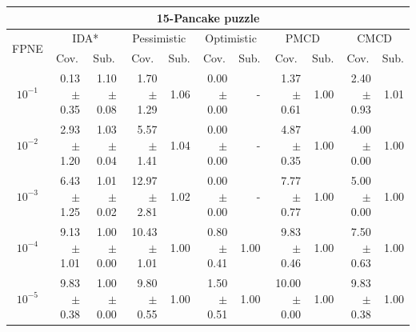 \documentclass[letterpaper]{article}
\begin{document}
\begin{table}[t]
\centering
\setlength{\tabcolsep}{4 pt}
\begin{tabular}{| c | r  r | r  r | r  r | r  r | r  r |}
\hline
\multicolumn{11}{|c|}{\textbf{15-Pancake puzzle}} \\
\hline
\multirow{2}{*}{FPNE}	& \multicolumn{2}{|c|}{IDA*} 	& \multicolumn{2}{|c|}{Pessimistic} 	& \multicolumn{2}{|c|}{Optimistic} 	& \multicolumn{2}{|c|}{PMCD} 	& \multicolumn{2}{|c|}{CMCD} 	\\
\cline{2-11} 
	& \multicolumn{1}{c}{Cov.} & \multicolumn{1}{c|}{Sub.} 	& \multicolumn{1}{c}{Cov.} & \multicolumn{1}{c|}{Sub.} 	& \multicolumn{1}{c}{Cov.} & \multicolumn{1}{c|}{Sub.} 	& \multicolumn{1}{c}{Cov.} & \multicolumn{1}{c|}{Sub.} 	& \multicolumn{1}{c}{Cov.} & \multicolumn{1}{c|}{Sub.} 	\\
\hline


$10^{-1}$	& 0.13 $\pm$ 0.35	& 1.10 $\pm$ 0.08	& 1.70 $\pm$ 1.29	& 1.06	& 0.00 $\pm$ 0.00	& - 	& 1.37 $\pm$ 0.61	& 1.00	& 2.40 $\pm$ 0.93	& 1.01	\\

$10^{-2}$	& 2.93 $\pm$ 1.20	& 1.03 $\pm$ 0.04	& 5.57 $\pm$ 1.41	& 1.04	& 0.00 $\pm$ 0.00	& - 	& 4.87 $\pm$ 0.35	& 1.00	& 4.00 $\pm$ 0.00	& 1.00	\\

$10^{-3}$	& 6.43 $\pm$ 1.25	& 1.01 $\pm$ 0.02	& 12.97 $\pm$ 2.81	& 1.02	& 0.00 $\pm$ 0.00	& - 	& 7.77 $\pm$ 0.77	& 1.00	& 5.00 $\pm$ 0.00	& 1.00	\\

$10^{-4}$	& 9.13 $\pm$ 1.01	& 1.00 $\pm$ 0.00	& 10.43 $\pm$ 1.01	& 1.00	& 0.80 $\pm$ 0.41	& 1.00	& 9.83 $\pm$ 0.46	& 1.00	& 7.50 $\pm$ 0.63	& 1.00	\\

$10^{-5}$	& 9.83 $\pm$ 0.38	& 1.00 $\pm$ 0.00	& 9.80 $\pm$ 0.55	& 1.00	& 1.50 $\pm$ 0.51	& 1.00	& 10.00 $\pm$ 0.00	& 1.00	& 9.83 $\pm$ 0.38	& 1.00	\\




\end{tabular}
\end{table}
\end{document}
